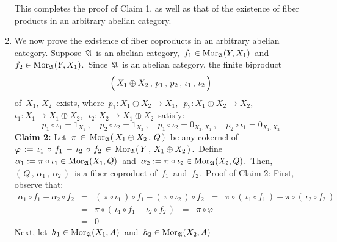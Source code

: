 \begin{enumerate}
	This completes the proof of Claim 1,
	as well as that of the existence of fiber products in an arbitrary abelian category.
\item
	We now prove the existence of fiber coproducts in an arbitrary abelian category.
	Suppose \,$\mathfrak{A}$\, is an abelian category,
	\,$f_{1} \in \textnormal{Mor}_{\mathfrak{A}}(Y,X_{1})$\,
	and
	\,$f_{2} \in \textnormal{Mor}_{\mathfrak{A}}(Y,X_{1})$.\,
	Since \,$\mathfrak{A}$\, is an abelian category, the finite {\color{red}biproduct}
	\begin{equation*}
	\left(\,
		X_{1} \overset{{\color{white}.}}{\oplus} X_{2}
		\,,\,
		p_{1}
		\,,\,
		p_{2}
		\,,\,
		\iota_{1}
		\,,\,
		\iota_{2}
		\,\right)
	\end{equation*}
	of \,$X_{1},\, X_{2}$\, exists, where
	\,$p_{1} : X_{1} \oplus X_{2} \longrightarrow X_{1}$,\,
	\,$p_{2} : X_{1} \oplus X_{2} \longrightarrow X_{2}$,\,
	\,$\iota_{1} : X_{1} \longrightarrow X_{1} \oplus X_{2}$,\,
	\,$\iota_{2} : X_{2} \longrightarrow X_{1} \oplus X_{2}$\,
	satisfy:
	\begin{equation*}
	p_{1} \circ \iota_{1} = 1_{X_{1}}\,,
	\quad
	p_{2} \circ \iota_{2} = 1_{X_{2}}\,,
	\quad
	p_{1} \circ \iota_{2} = 0_{X_{2},X_{1}}\,,
	\quad
	p_{2} \circ \iota_{1} = 0_{X_{1},X_{2}}
	\end{equation*}
	\vskip 0.3cm
	\noindent
	\textbf{Claim 2:}\quad
	Let \,$\pi \,\in\, \textnormal{Mor}_{\mathfrak{A}}(\,X_{1}\oplus X_{2}\,,\,Q\,)$\,
	be any {\color{red}cokernel of
	\,$\varphi\,:=\,\iota_{1}\,\circ\,f_{1}\,-\,\iota_{2}\,\circ\,f_{2}\,\in\,\textnormal{Mor}_{\mathfrak{A}}(\,Y\,,\,X_{1} \oplus X_{2}\,)$}.\,
	Define
	\,$\alpha_{1} := \pi \circ \iota_{1} \in \textnormal{Mor}_{\mathfrak{A}}(X_{1},Q)$\,
	and
	\,$\alpha_{2} := \pi \circ \iota_{2} \in \textnormal{Mor}_{\mathfrak{A}}(X_{2},Q)$.\,
	Then,
	\,$\left(\,Q\,,\,\alpha_{1}\,,\,\alpha_{2}\,\right)$\,
	is a fiber coproduct of
	\,$f_{1}$\,
	and
	\,$f_{2}$.\,
	\vskip 0.2cm
	\noindent
	Proof of Claim 2:\;\;
	First, observe that:
	\begin{eqnarray*}
	\alpha_{1} \circ f_{1} - \alpha_{2} \circ f_{2}
	& = &
		(\,\pi \circ \iota_{1}\,) \circ f_{1} - (\,\pi \circ \iota_{2}\,) \circ f_{2}
	\;\; = \;\;
		\pi \circ (\,\iota_{1} \circ f_{1}\,) - \pi \circ (\,\iota_{2} \circ f_{2}\,)
	\\
	& = &
		\pi \circ (\,\iota_{1} \circ f_{1} - \iota_{2} \circ f_{2}\,) 
	\;\; = \;\;
		\pi \circ \varphi
	\\
	& = &
		0
	\end{eqnarray*}
	Next, let
	\,$h_{1} \in \textnormal{Mor}_{\mathfrak{A}}(X_{1},A)$\,
	and
	\,$h_{2} \in \textnormal{Mor}_{\mathfrak{A}}(X_{2},A)$\,

\end{enumerate}
